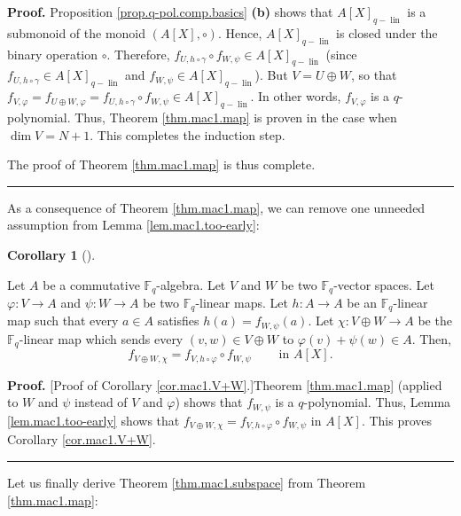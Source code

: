 \documentclass[numbers=enddot,12pt,final,onecolumn,notitlepage]{scrartcl}%
\theoremstyle{definition}
\newtheorem{coro}[theo]{Corollary}
\newenvironment{corollary}[1][]
{\begin{coro}[#1]\begin{leftbar}}
{\end{leftbar}\end{coro}}
\newenvironment{proof}[1][Proof]{\noindent\textbf{#1.} }{\ \rule{0.5em}{0.5em}}
\begin{document}
\begin{proof}
Proposition \ref{prop.q-pol.comp.basics} \textbf{(b)} shows that $A\left[
X\right]  _{q-\operatorname*{lin}}$ is a submonoid of the monoid $\left(
A\left[  X\right]  ,\circ\right)  $. Hence, $A\left[  X\right]
_{q-\operatorname*{lin}}$ is closed under the binary operation $\circ$.
Therefore, $f_{U,h\circ\gamma}\circ f_{W,\psi}\in A\left[  X\right]
_{q-\operatorname*{lin}}$ (since $f_{U,h\circ\gamma}\in A\left[  X\right]
_{q-\operatorname*{lin}}$ and $f_{W,\psi}\in A\left[  X\right]
_{q-\operatorname*{lin}}$). But $V=U\oplus W$, so that $f_{V,\varphi
}=f_{U\oplus W,\varphi}=f_{U,h\circ\gamma}\circ f_{W,\psi}\in A\left[
X\right]  _{q-\operatorname*{lin}}$. In other words, $f_{V,\varphi}$ is a
$q$-polynomial. Thus, Theorem \ref{thm.mac1.map} is proven in the case when
$\dim V=N+1$. This completes the induction step.

The proof of Theorem \ref{thm.mac1.map} is thus complete.
\end{proof}

As a consequence of Theorem \ref{thm.mac1.map}, we can remove one unneeded
assumption from Lemma \ref{lem.mac1.too-early}:

\begin{corollary}
\label{cor.mac1.V+W}Let $A$ be a commutative $\mathbb{F}_{q}$-algebra. Let $V$
and $W$ be two $\mathbb{F}_{q}$-vector spaces. Let $\varphi:V\rightarrow A$
and $\psi:W\rightarrow A$ be two $\mathbb{F}_{q}$-linear maps. Let
$h:A\rightarrow A$ be an $\mathbb{F}_{q}$-linear map such that every $a\in A$
satisfies $h\left(  a\right)  =f_{W,\psi}\left(  a\right)  $. Let
$\chi:V\oplus W\rightarrow A$ be the $\mathbb{F}_{q}$-linear map which sends
every $\left(  v,w\right)  \in V\oplus W$ to $\varphi\left(  v\right)
+\psi\left(  w\right)  \in A$. Then,%
\[
f_{V\oplus W,\chi}=f_{V,h\circ\varphi}\circ f_{W,\psi}%
\ \ \ \ \ \ \ \ \ \ \text{in }A\left[  X\right]  .
\]

\end{corollary}

\begin{proof}
[Proof of Corollary \ref{cor.mac1.V+W}.]Theorem \ref{thm.mac1.map} (applied to
$W$ and $\psi$ instead of $V$ and $\varphi$) shows that $f_{W,\psi}$ is a
$q$-polynomial. Thus, Lemma \ref{lem.mac1.too-early} shows that $f_{V\oplus
W,\chi}=f_{V,h\circ\varphi}\circ f_{W,\psi}$ in $A\left[  X\right]  $. This
proves Corollary \ref{cor.mac1.V+W}.
\end{proof}

Let us finally derive Theorem \ref{thm.mac1.subspace} from Theorem
\ref{thm.mac1.map}:
\end{document}
